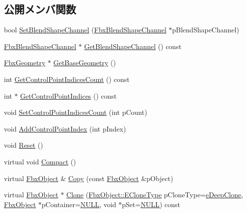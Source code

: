 \subsection*{公開メンバ関数}
\begin{DoxyCompactItemize}
\item 
bool \hyperlink{class_fbx_shape_ae3e784d16a332f9c874f745846a2980e}{Set\+Blend\+Shape\+Channel} (\hyperlink{class_fbx_blend_shape_channel}{Fbx\+Blend\+Shape\+Channel} $\ast$p\+Blend\+Shape\+Channel)
\item 
\hyperlink{class_fbx_blend_shape_channel}{Fbx\+Blend\+Shape\+Channel} $\ast$ \hyperlink{class_fbx_shape_a311a362cbfde68630794a7fb20cff9ee}{Get\+Blend\+Shape\+Channel} () const
\item 
\hyperlink{class_fbx_geometry}{Fbx\+Geometry} $\ast$ \hyperlink{class_fbx_shape_ad011e68be3532c1e16c9871f7b31d8b4}{Get\+Base\+Geometry} ()
\item 
int \hyperlink{class_fbx_shape_afd2216f7ace9be5b39f2d5d6dcc8447f}{Get\+Control\+Point\+Indices\+Count} () const
\item 
int $\ast$ \hyperlink{class_fbx_shape_ad32f3e5fef82478e0f5c5bdf499b8f28}{Get\+Control\+Point\+Indices} () const
\item 
void \hyperlink{class_fbx_shape_a6c62c9590c9634305a65f50916eaded3}{Set\+Control\+Point\+Indices\+Count} (int p\+Count)
\item 
void \hyperlink{class_fbx_shape_ac64fb6d8fc185a698a7c982805538e47}{Add\+Control\+Point\+Index} (int p\+Index)
\item 
void \hyperlink{class_fbx_shape_afe25ad1148c4165f9821cc7bc7b50c94}{Reset} ()
\item 
virtual void \hyperlink{class_fbx_shape_a9c3c948d3646bf78472164860ad11d65}{Compact} ()
\item 
virtual \hyperlink{class_fbx_object}{Fbx\+Object} \& \hyperlink{class_fbx_shape_ab9776a1c0ce41830bc6841ebba4c4a23}{Copy} (const \hyperlink{class_fbx_object}{Fbx\+Object} \&p\+Object)
\item 
virtual \hyperlink{class_fbx_object}{Fbx\+Object} $\ast$ \hyperlink{class_fbx_shape_aca0dfb34dc9b38d5fdbf0d004fc60697}{Clone} (\hyperlink{class_fbx_object_a9f5626b2d2135684d6ea1e6e4ad2acbb}{Fbx\+Object\+::\+E\+Clone\+Type} p\+Clone\+Type=\hyperlink{class_fbx_object_a9f5626b2d2135684d6ea1e6e4ad2acbbaacdf137ca059c572798287e98c4236d0}{e\+Deep\+Clone}, \hyperlink{class_fbx_object}{Fbx\+Object} $\ast$p\+Container=\hyperlink{fbxarch_8h_a070d2ce7b6bb7e5c05602aa8c308d0c4}{N\+U\+LL}, void $\ast$p\+Set=\hyperlink{fbxarch_8h_a070d2ce7b6bb7e5c05602aa8c308d0c4}{N\+U\+LL}) const
\end{DoxyCompactItemize}
